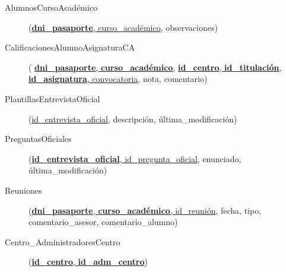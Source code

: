   \begin{description}
    \item[AlumnosCursoAcadémico] \begin{flushleft}(\underline{\textbf{dni\_pasaporte},
    curso\_académico}, observaciones)\end{flushleft}
  \end{description}

  \begin{description}
    \item[CalificacionesAlumnoAsignaturaCA] \begin{flushleft}(         \underline{\textbf{dni\_pasaporte}, \textbf{curso\_académico},}
    \underline{\textbf{id\_centro}, \textbf{id\_titulación},
    \textbf{id\_asignatura}, convocatoria}, nota, comentario)
    \end{flushleft}
  \end{description}

  \begin{description}
    \item[PlantillasEntrevistaOficial] \begin{flushleft}(\underline{id\_entrevista\_oficial}, descripción,
    última\_modificación)\end{flushleft}
  \end{description}

  \begin{description}
    \item[PreguntasOficiales] \begin{flushleft}(\underline{\textbf{id\_entrevista\_oficial},
    id\_pregunta\_oficial}, enunciado, última\_modificación)\end{flushleft}
  \end{description}

  \begin{description}
    \item[Reuniones] \begin{flushleft}(\underline{\textbf{dni\_pasaporte},
    \textbf{curso\_académico}, id\_reunión}, fecha, tipo,
    comentario\_asesor, comentario\_alumno)\end{flushleft}
  \end{description}

  \begin{description}
    \item[Centro\_AdministradoresCentro] \begin{flushleft}(\underline{\textbf{id\_centro},
    \textbf{id\_adm\_centro}})\end{flushleft}
  \end{description}

